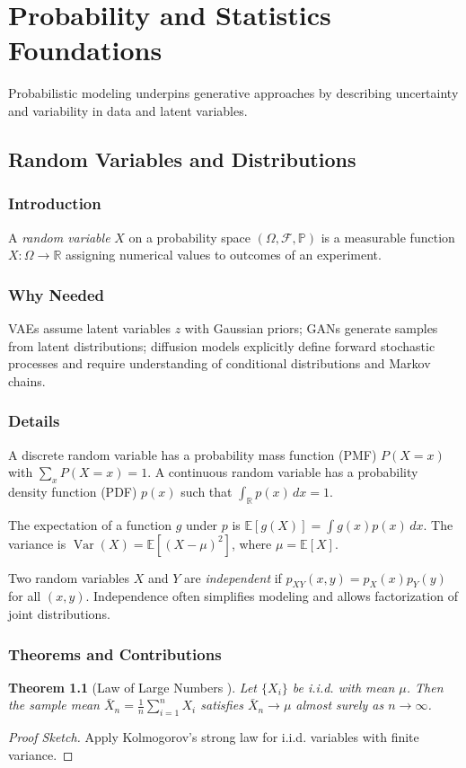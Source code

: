 \documentclass[11pt]{book}
\newtheorem{theorem}{Theorem}[chapter]
\begin{document}
\chapter{Probability and Statistics Foundations}
Probabilistic modeling underpins generative approaches by describing uncertainty and variability in data and latent variables.

\section{Random Variables and Distributions}
\subsection{Introduction}
A \emph{random variable} $X$ on a probability space $(\Omega,\mathcal{F},\mathbb{P})$ is a measurable function $X:\Omega\to\mathbb{R}$ assigning numerical values to outcomes of an experiment.

\subsection{Why Needed}
VAEs assume latent variables $z$ with Gaussian priors; GANs generate samples from latent distributions; diffusion models explicitly define forward stochastic processes and require understanding of conditional distributions and Markov chains.

\subsection{Details}
A discrete random variable has a probability mass function (PMF) $P(X=x)$ with $\sum_x P(X=x)=1$. A continuous random variable has a probability density function (PDF) $p(x)$ such that $\int_{\mathbb{R}} p(x)\,dx=1$.

The expectation of a function $g$ under $p$ is $\mathbb{E}[g(X)]=\int g(x)p(x)\,dx$. The variance is $\operatorname{Var}(X)=\mathbb{E}[(X-\mu)^2]$, where $\mu=\mathbb{E}[X]$.

Two random variables $X$ and $Y$ are \emph{independent} if $p_{XY}(x,y)=p_X(x)p_Y(y)$ for all $(x,y)$. Independence often simplifies modeling and allows factorization of joint distributions.

\subsection{Theorems and Contributions}
\begin{theorem}[Law of Large Numbers \cite{bernoulli1713}]
Let $\{X_i\}$ be i.i.d. with mean $\mu$. Then the sample mean $\bar{X}_n=\frac1n\sum_{i=1}^n X_i$ satisfies $\bar{X}_n\to\mu$ almost surely as $n\to\infty$.
\end{theorem}
\begin{proof}[Proof Sketch]
Apply Kolmogorov's strong law for i.i.d. variables with finite variance.
\end{proof}
\end{document}
